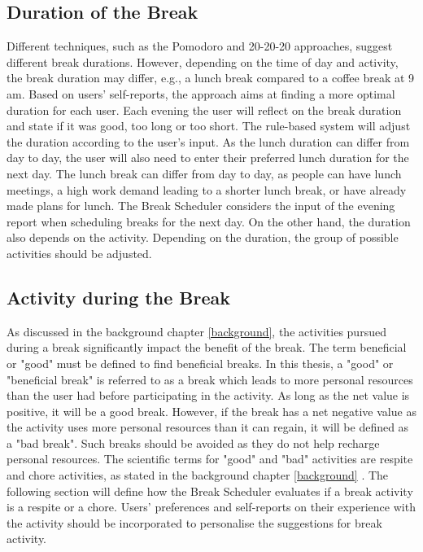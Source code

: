 \documentclass{hasel_thesis}
\begin{document}
\subsection{Duration of the Break}
Different techniques, such as the Pomodoro and 20-20-20 approaches, suggest different break durations. However, depending on the time of day and activity, the break duration may differ, e.g., a lunch break compared to a coffee break at 9 am. Based on users' self-reports, the approach aims at finding a more optimal duration for each user. Each evening the user will reflect on the break duration and state if it was good, too long or too short. The rule-based system will adjust the duration according to the user's input. As the lunch duration can differ from day to day, the user will also need to enter their preferred lunch duration for the next day. The lunch break can differ from day to day, as people can have lunch meetings, a high work demand leading to a shorter lunch break, or have already made plans for lunch. The Break Scheduler considers the input of the evening report when scheduling breaks for the next day. On the other hand, the duration also depends on the activity. Depending on the duration, the group of possible activities should be adjusted.

\subsection{Activity during the Break}
As discussed in the background chapter \ref{background}, the activities pursued during a break significantly impact the benefit of the break. The term beneficial or "good" must be defined to find beneficial breaks. In this thesis, a "good" or "beneficial break" is referred to as a break which leads to more personal resources than the user had before participating in the activity. As long as the net value is positive, it will be a good break. However, if the break has a net negative value as the activity uses more personal resources than it can regain, it will be defined as a "bad break". Such breaks should be avoided as they do not help recharge personal resources. 
The scientific terms for "good" and "bad" activities are respite and chore activities, as stated in the background chapter \ref{background} \cite{Trougakos.2009}. The following section will define how the Break Scheduler evaluates if a break activity is a respite or a chore. Users' preferences and self-reports on their experience with the activity should be incorporated to personalise the suggestions for break activity. 
\end{document}

